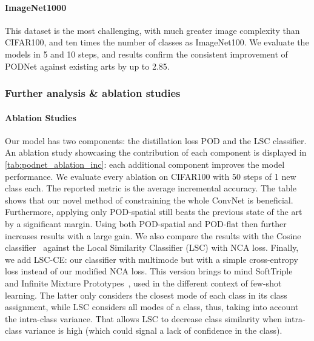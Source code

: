 \paragraph{ImageNet1000} This dataset is the most challenging, with much greater image complexity
than CIFAR100, and ten times the number of classes as ImageNet100. We evaluate the models in 5 and
10 steps, and results confirm the consistent improvement of \ac{PODNet} against existing arts by up
to 2.85\pp.




\subsubsection{Further analysis \& ablation studies}
\label{sec:podnet_ablation}

\paragraph{Ablation Studies}
Our model has two components: the distillation loss \ac{POD} and the \ac{LSC} classifier. An
ablation study showcasing the contribution of each component is displayed in
\autoref{tab:podnet_ablation_inc}: each additional component improves the model performance. We
evaluate every ablation on CIFAR100 with 50 steps of 1 new class each. The reported metric is the
average incremental accuracy. The table shows that our novel method of constraining the whole
\ac{ConvNet} is beneficial. Furthermore, applying only POD-spatial still beats the previous state of
the art by a significant margin. Using both POD-spatial and POD-flat then further increases results
with a large gain. We also compare the results with the Cosine
classifier~\citep{luo2018cosine_classifier,hou2019ucir} against the Local Similarity Classifier
(LSC) with NCA loss. Finally, we add LSC-CE: our classifier with multimode but with a simple
cross-entropy loss instead of our modified NCA loss. This version brings to mind
SoftTriple~\citep{qian2019softtriple} and Infinite Mixture
Prototypes~\citep{allen2019infinitemixtureproto}, used in the different context of few-shot
learning.
The latter only considers the closest mode of each class in its class assignment, while \ac{LSC}
considers all modes of a class, thus, taking into account the intra-class variance. That allows
\ac{LSC} to decrease class similarity when intra-class variance is high (which could signal a lack
of confidence in the class).

